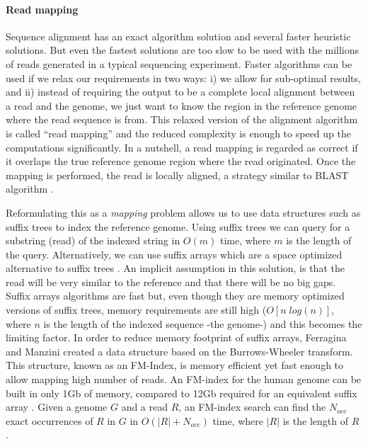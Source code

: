 \paragraph{Read mapping} Sequence alignment has an exact algorithm solution and several faster heuristic solutions. But even the fastest solutions are too slow to be used with the millions of reads generated in a typical sequencing experiment. Faster algorithms can be used if we relax our requirements in two ways: i) we allow for sub-optimal results, and ii) instead of requiring the output to be a complete local alignment between a read and the genome, we just want to know the region in the reference genome where the read sequence is from. This relaxed version of the alignment algorithm is called ``read mapping'' and the reduced complexity is enough to speed up the computations significantly. In a nutshell, a read mapping is regarded as correct if it overlaps the true reference genome region where the read originated. Once the mapping is performed, the read is locally aligned, a strategy similar to BLAST algorithm \cite{li2010fast, langmead2009ultrafast}.

Reformulating this as a \textit{mapping} problem allows us to use data structures such as suffix trees to index the reference genome. Using suffix trees we can query for a substring (read) \cite{durbin1998biological} of the indexed string in $O(m)$ time, where $m$ is the length of the query. Alternatively, we can use suffix arrays which are a space optimized alternative to suffix trees \cite{durbin1998biological}. An implicit assumption in this solution, is that the read will be very similar to the reference and that there will be no big gaps. Suffix arrays algorithms are fast but, even though they are memory optimized versions of suffix trees, memory requirements are still high ($O[ n \; log(n) ]$, where $n$ is the length of the indexed sequence -the genome-) and this becomes the limiting factor. In order to reduce memory footprint of suffix arrays, Ferragina and Manzini \cite{ferragina2000opportunistic} created a data structure based on the Burrows-Wheeler transform.  This structure, known as an FM-Index, is memory efficient yet fast enough to allow mapping high number of reads.  An FM-index for the human genome can be built in only 1Gb of memory, compared to 12Gb required for an equivalent suffix array \cite{li2010fast}.  Given a genome $G$ and a read $R$, an FM-index search can find the $N_{occ}$ exact occurrences of $R$ in $G$ in $O(|R| + N_{occ} )$ time, where $|R|$ is the length of $R$ \cite{li2010fast}. 


